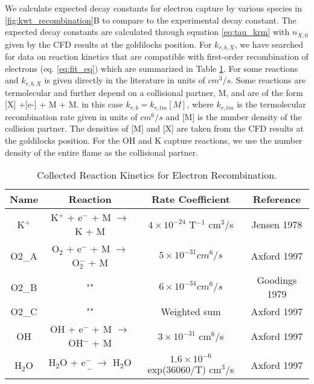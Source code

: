 We calculate expected decay constants for electron capture by various species in \ref{fig:kwt_recombination}B to compare to the experimental decay constant. The expected decay constants are calculated through equation \ref{eq:tau_krm} with $n_{X,0}$ given by the CFD results at the goldilocks position. For $k_{r,b,X}$, we have searched for data on reaction kinetics that are compatible with first-order recombination of electrons (eq. \ref{eq:fit_eq}) which are summarized in Table \ref{tab:reactions}. For some reactions and $k_{r,b,X}$ is given directly in the literature in units of $cm^3/s$. Some reactions are termolecular and further depend on a collisional partner, M, and are of the form [X] +[e-] + M \rightarrow [X-] + M. in this case $k_{r,b} = k_{r,tm} [M]$, where $k_{r,tm}$ is the termolecular recombination rate given in units of $cm^6/s$ and [M] is the number density of the collision partner.  The densities of [M] and [X] are taken from the CFD results at the goldilocks position. For the OH and K capture reactions, we use the number density of the entire flame as the collisional partner. 


\begin{table}[h]
\centering
\caption{Collected Reaction Kinetics for Electron Recombination.}
\label{tab:reactions}
\begin{tabular}{|c|c|c|c|}
\hline
Name & Reaction & Rate Coefficient & Reference \\
\hline
K$^+$ & K$^+$ + e$^-$ + M $\rightarrow$ K + M & $4 \times 10^{-24}$ T$^{-1}$ cm$^3$/s & Jensen 1978 \\
\hline
O2\_A & O$_2$ + e$^-$ + M $\rightarrow$ O$_2^-$ + M & $5 \times 10^{-31} cm^6/s$ & Axford 1997 \\
\hline
O2\_B & ""                                          & $6 \times 10^{-34} cm^6/s$ &  Goodings 1979 \\
\hline
O2\_C & ""                                          & Weighted sum  &  Axford 1997 \\
\hline
OH & OH + e$^-$ + M $\rightarrow$ OH$^-$ + M & $3 \times 10^{-31}$ cm$^6$/s & Axford 1997 \\
\hline
H$_2$O & H$_2$O + e$^-$ $\rightarrow$ H$_2$O$^-$ & $1.6 \times 10^{-6}$ exp(36060/T) cm$^3$/s & Axford 1997 \\
\hline
\end{tabular}
\end{table}

